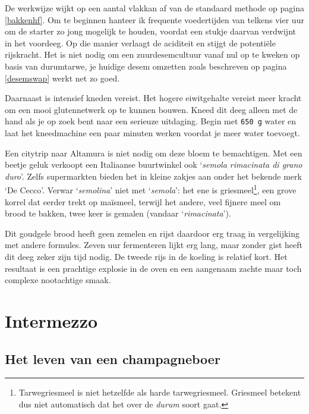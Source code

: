 \documentclass[
  11pt,
  dutch,
]{memoir}
\begin{document}
De werkwijze wijkt op een aantal vlakkan af van de standaard methode op
pagina \ref{bakkenhf}. Om te beginnen hanteer ik frequente voedertijden
van telkens vier uur om de starter zo jong mogelijk te houden, voordat
een stukje daarvan verdwijnt in het voordeeg. Op die manier verlaagt de
aciditeit en stijgt de potentiële rijskracht. Het is niet nodig om een
zuurdesemcultuur vanaf nul op te kweken op basis van durumtarwe, je
huidige desem omzetten zoals beschreven op pagina \ref{desemswap} werkt
net zo goed.

Daarnaast is intensief kneden vereist. Het hogere eiwitgehalte vereist
meer kracht om een mooi glutennetwerk op te kunnen bouwen. Kneed dit
deeg alleen met de hand als je op zoek bent naar een serieuze uitdaging.
Begin met \texttt{650\ g} water en laat het kneedmachine een paar
minuten werken voordat je meer water toevoegt.

Een citytrip naar Altamura is niet nodig om deze bloem te bemachtigen.
Met een beetje geluk verkoopt een Italiaanse buurtwinkel ook
`\emph{semola rimacinata di grano duro}'. Zelfs supermarkten bieden het
in kleine zakjes aan onder het bekende merk `De Cecco'. Verwar
`\emph{semolina}' niet met `\emph{semola}': het ene is
griesmeel\footnote{Tarwegriesmeel is niet hetzelfde als harde
  tarwegriesmeel. Griesmeel betekent dus niet automatisch dat het over
  de \emph{durum} soort gaat.}, een grove korrel dat eerder trekt op
maïsmeel, terwijl het andere, veel fijnere meel om brood te bakken, twee
keer is gemalen (vandaar `\emph{rimacinata}').

Dit goudgele brood heeft geen zemelen en rijst daardoor erg traag in
vergelijking met andere formules. Zeven uur fermenteren lijkt erg lang,
maar zonder gist heeft dit deeg zeker zijn tijd nodig. De tweede rijs in
de koeling is relatief kort. Het resultaat is een prachtige explosie in
de oven en een aangenaam zachte maar toch complexe nootachtige smaak.

\hypertarget{intermezzo}{%
\chapter{Intermezzo}\label{intermezzo}}

\label{intermezzo}

\hypertarget{het-leven-van-een-champagneboer}{%
\section{Het leven van een
champagneboer}\label{het-leven-van-een-champagneboer}}
\end{document}
